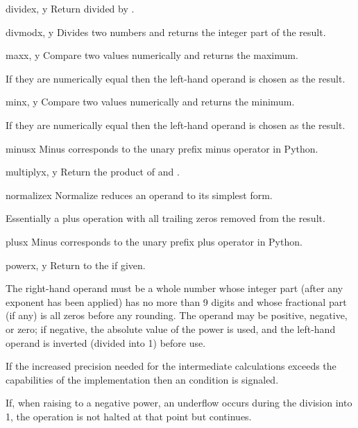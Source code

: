 \begin{methoddesc}{divide}{x, y}
  Return  divided by .
\end{methoddesc}   
  
\begin{methoddesc}{divmod}{x, y}
  Divides two numbers and returns the integer part of the result.
\end{methoddesc} 

\begin{methoddesc}{max}{x, y}
  Compare two values numerically and returns the maximum.

  If they are numerically equal then the left-hand operand is chosen as the
  result.
\end{methoddesc} 
 
\begin{methoddesc}{min}{x, y}
  Compare two values numerically and returns the minimum.

  If they are numerically equal then the left-hand operand is chosen as the
  result.
\end{methoddesc}

\begin{methoddesc}{minus}{x}
  Minus corresponds to the unary prefix minus operator in Python.
\end{methoddesc}

\begin{methoddesc}{multiply}{x, y}
  Return the product of  and .
\end{methoddesc}

\begin{methoddesc}{normalize}{x}
  Normalize reduces an operand to its simplest form.

  Essentially a plus operation with all trailing zeros removed from the
  result.
\end{methoddesc}
  
\begin{methoddesc}{plus}{x}
  Minus corresponds to the unary prefix plus operator in Python.
\end{methoddesc}

\begin{methoddesc}{power}{x, y}
  Return  to the  if given.

  The right-hand operand must be a whole number whose integer part (after any
  exponent has been applied) has no more than 9 digits and whose fractional
  part (if any) is all zeros before any rounding. The operand may be positive,
  negative, or zero; if negative, the absolute value of the power is used, and
  the left-hand operand is inverted (divided into 1) before use.

  If the increased precision needed for the intermediate calculations exceeds
  the capabilities of the implementation then an 
  condition is signaled.

  If, when raising to a negative power, an underflow occurs during the
  division into 1, the operation is not halted at that point but continues. 
\end{methoddesc}

